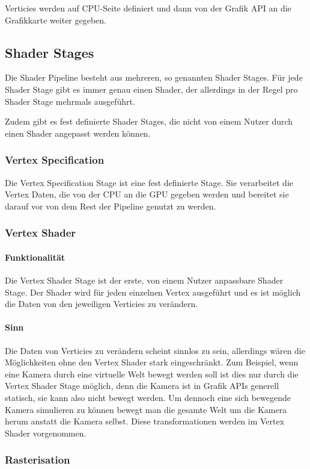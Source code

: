 Verticies werden auf CPU-Seite definiert und dann von der Grafik API an die Grafikkarte weiter gegeben.

\subsection{Shader Stages}
Die Shader Pipeline besteht aus mehreren, so genannten Shader Stages. Für jede Shader Stage gibt es immer genau einen Shader, der allerdings in der Regel pro Shader Stage mehrmals ausgeführt.

Zudem gibt es fest definierte Shader Stages, die nicht von einem Nutzer durch einen Shader angepasst werden können.

\subsubsection{Vertex Specification}
Die Vertex Specification Stage ist eine fest definierte Stage. Sie verarbeitet die Vertex Daten, die von der CPU an die GPU gegeben werden und bereitet sie darauf vor von dem Rest der Pipeline genutzt zu werden.

\subsubsection{Vertex Shader}
\paragraph{Funktionalität}
Die Vertex Shader Stage ist der erste, von einem Nutzer anpassbare Shader Stage. Der Shader wird für jeden einzelnen Vertex ausgeführt und es ist möglich die Daten von den jeweiligen Verticies zu verändern.

\paragraph{Sinn}
Die Daten von Verticies zu verändern scheint sinnlos zu sein, allerdings wären die Möglichkeiten ohne den Vertex Shader stark eingeschränkt. Zum Beispiel, wenn eine Kamera durch eine virtuelle Welt bewegt werden soll ist dies nur durch die Vertex Shader Stage möglich, denn die Kamera ist in Grafik APIs generell statisch, sie kann also nicht bewegt werden. Um dennoch eine sich bewegende Kamera simulieren zu können bewegt man die gesamte Welt um die Kamera herum anstatt die Kamera selbst. Diese transformationen werden im Vertex Shader vorgenommen.

\subsubsection{Rasterisation}
